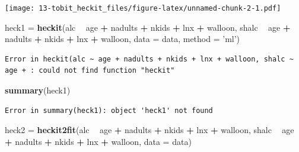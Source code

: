 \documentclass[]{book}
\newenvironment{Shaded}{\begin{snugshade}}{\end{snugshade}}
\newcommand{\DataTypeTok}[1]{\textcolor[rgb]{0.13,0.29,0.53}{#1}}
\newcommand{\KeywordTok}[1]{\textcolor[rgb]{0.13,0.29,0.53}{\textbf{#1}}}
\newcommand{\NormalTok}[1]{#1}
\newcommand{\OperatorTok}[1]{\textcolor[rgb]{0.81,0.36,0.00}{\textbf{#1}}}
\newcommand{\StringTok}[1]{\textcolor[rgb]{0.31,0.60,0.02}{#1}}
\begin{document}
\texttt{[image: 13-tobit\_heckit\_files/figure-latex/unnamed-chunk-2-1.pdf]}

\begin{Shaded}
\begin{Highlighting}[]
\NormalTok{heck1 =}\StringTok{ }\KeywordTok{heckit}\NormalTok{(alc }\OperatorTok{~}\StringTok{ }\NormalTok{age }\OperatorTok{+}\StringTok{ }\NormalTok{nadults }\OperatorTok{+}\StringTok{ }\NormalTok{nkids }\OperatorTok{+}\StringTok{ }\NormalTok{lnx }\OperatorTok{+}\StringTok{ }\NormalTok{walloon, shalc }\OperatorTok{~}\StringTok{  }\NormalTok{age }\OperatorTok{+}\StringTok{ }\NormalTok{nadults }\OperatorTok{+}\StringTok{ }\NormalTok{nkids }\OperatorTok{+}\StringTok{ }\NormalTok{lnx }\OperatorTok{+}\StringTok{ }\NormalTok{walloon, }\DataTypeTok{data =}\NormalTok{ data, }\DataTypeTok{method =} \StringTok{'ml'}\NormalTok{)}
\end{Highlighting}
\end{Shaded}

\begin{verbatim}
Error in heckit(alc ~ age + nadults + nkids + lnx + walloon, shalc ~ age + : could not find function "heckit"
\end{verbatim}

\begin{Shaded}
\begin{Highlighting}[]
\KeywordTok{summary}\NormalTok{(heck1)}
\end{Highlighting}
\end{Shaded}

\begin{verbatim}
Error in summary(heck1): object 'heck1' not found
\end{verbatim}

\begin{Shaded}
\begin{Highlighting}[]
\NormalTok{heck2 =}\StringTok{ }\KeywordTok{heckit2fit}\NormalTok{(alc }\OperatorTok{~}\StringTok{ }\NormalTok{age }\OperatorTok{+}\StringTok{ }\NormalTok{nadults }\OperatorTok{+}\StringTok{ }\NormalTok{nkids }\OperatorTok{+}\StringTok{ }\NormalTok{lnx }\OperatorTok{+}\StringTok{ }\NormalTok{walloon, shalc }\OperatorTok{~}\StringTok{  }\NormalTok{age }\OperatorTok{+}\StringTok{ }\NormalTok{nadults }\OperatorTok{+}\StringTok{ }\NormalTok{nkids }\OperatorTok{+}\StringTok{ }\NormalTok{lnx }\OperatorTok{+}\StringTok{ }\NormalTok{walloon, }\DataTypeTok{data =}\NormalTok{ data)}
\end{Highlighting}
\end{Shaded}
\end{document}
